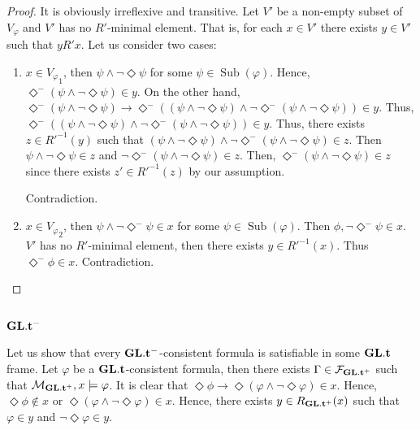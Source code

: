 \documentclass[a4paper]{article}
\theoremstyle{defin}
\theoremstyle{theorem}
\theoremstyle{prop}
\theoremstyle{lemma}
\theoremstyle{ex}
\theoremstyle{col}
\newcommand{\DiamondM}{\Diamond^{-}}
\begin{document}
\begin{proof}
  It is obviously irreflexive and transitive.
  Let $V'$ be a non-empty subset of $V_{\varphi}$ and $V'$ has no $R'$-minimal element.
  That is, for each $x \in V'$ there exists $y \in V'$ such that $y R' x$.
  Let us consider two cases:

  \begin{enumerate}
    \item $x \in {V_{\varphi}}_1$, then $\psi \land \neg \Diamond \psi$ for some $\psi \in \operatorname{Sub}(\varphi)$. Hence, $\DiamondM (\psi \land \neg \Diamond \psi) \in y$. On the other hand,
    $\DiamondM (\psi \land \neg \Diamond \psi) \to \DiamondM((\psi \land \neg \Diamond \psi) \land \neg \DiamondM (\psi \land \neg \Diamond \psi)) \in y$.
    Thus, $\DiamondM((\psi \land \neg \Diamond \psi) \land \neg \DiamondM (\psi \land \neg \Diamond \psi)) \in y$. Thus, there exists $z \in {R'}^{-1}(y)$ such that
    $(\psi \land \neg \Diamond \psi) \land \neg \DiamondM (\psi \land \neg \Diamond \psi) \in z$. Then $\psi \land \neg \Diamond \psi \in z$ and $\neg \DiamondM (\psi \land \neg \Diamond \psi) \in z$. Then, $\DiamondM (\psi \land \neg \Diamond \psi) \in z$ since there exists $z' \in {R'}^{-1}(z)$ by our assumption.

    Contradiction.

    \item $x \in {V_{\varphi}}_2$, then $\psi \land \neg \DiamondM \psi \in x$ for some $\psi \in \operatorname{Sub}(\varphi)$. Then $\phi, \neg \DiamondM \psi \in x$. $V'$ has no $R'$-minimal element, then there exists $y \in {R'}^{-1}(x)$. Thus $\DiamondM \phi \in x$. Contradiction.
  \end{enumerate}
\end{proof}

\subsection{${\bf GL}.{\bf t}^{-}$}

Let us show that every ${\bf GL}.{\bf t}^{-}$-consistent formula is satisfiable in some ${\bf GL}.{\bf t}$ frame. Let $\varphi$ be a ${\bf GL}.{\bf t}$-consistent formula, then there exists $\Gamma \in \mathcal{F}_{{\bf GL}.{\bf t}^{+}}$ such that $\mathcal{M}_{{\bf GL}.{\bf t}^{+}}, x \models \varphi$. It is clear that $\Diamond \phi \to \Diamond (\varphi \land \neg \Diamond \varphi) \in x$.
Hence, $\Diamond \phi \notin x$ or $\Diamond (\varphi \land \neg \Diamond \varphi) \in x$. Hence, there exists $y \in R_{{\bf GL}.{\bf t}^{+}}(x)$ such that
$\varphi \in y$ and $\neg \Diamond \varphi \in y$.
\end{document}
